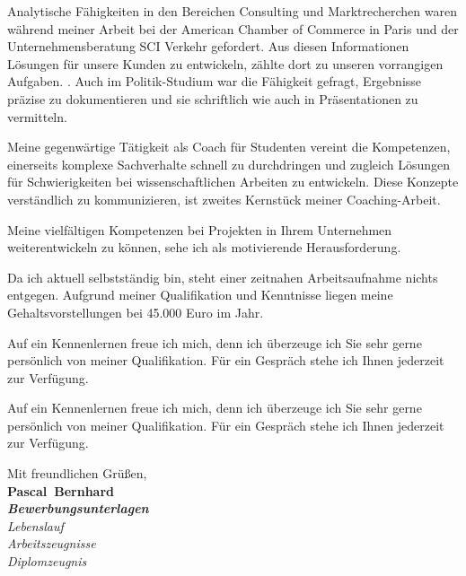 \documentclass[11pt,a4paper]{article}
\def\firstname{Pascal}
\def\familyname{Bernhard}
\begin{document}
Analytische Fähigkeiten in den Bereichen Consulting und Marktrecherchen waren während meiner Arbeit bei der American Chamber of Commerce in Paris und der Unternehmensberatung SCI Verkehr gefordert. Aus diesen Informationen Lösungen für unsere Kunden zu entwickeln, zählte dort zu unseren vorrangigen Aufgaben. . Auch im Politik-Studium war die Fähigkeit gefragt, Ergebnisse präzise zu dokumentieren und sie schriftlich wie auch in Präsentationen zu vermitteln. 

Meine gegenwärtige Tätigkeit als Coach für Studenten vereint die Kompetenzen, einerseits komplexe Sachverhalte schnell zu durchdringen und zugleich Lösungen für Schwierigkeiten bei wissenschaftlichen Arbeiten zu entwickeln. Diese Konzepte verständlich zu kommunizieren, ist zweites Kernstück meiner Coaching-Arbeit.



Meine vielfältigen Kompetenzen bei Projekten in Ihrem Unternehmen weiterentwickeln zu können, sehe ich als motivierende Herausforderung.


Da ich aktuell selbstständig bin, steht einer zeitnahen Arbeitsaufnahme nichts entgegen. Aufgrund meiner Qualifikation und Kenntnisse liegen meine Gehaltsvorstellungen bei 45.000 Euro im Jahr.



Auf ein Kennenlernen freue ich mich, denn ich überzeuge ich Sie sehr gerne persönlich von meiner Qualifikation. Für ein Gespräch stehe ich Ihnen jederzeit zur Verfügung.


\newpage

Auf ein Kennenlernen freue ich mich, denn ich überzeuge ich Sie sehr gerne persönlich von meiner Qualifikation. Für ein Gespräch stehe ich Ihnen jederzeit zur Verfügung.


  
Mit freundlichen Grüßen,\\[3em] %
%
{\bfseries \firstname~\familyname}\\
%
\vfill%
{\slshape \bfseries Bewerbungsunterlagen}\\
 {\slshape Lebenslauf\\
 Arbeitszeugnisse\\
 Diplomzeugnis{}}
\end{document}
